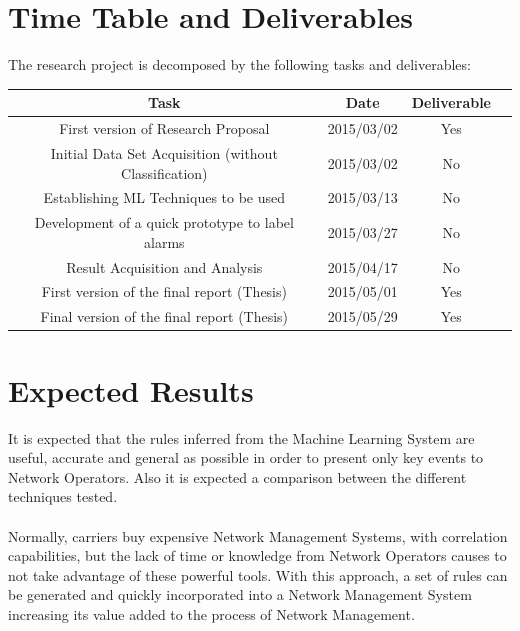 \documentclass[10pt,a4paper]{article}
\begin{document}
  \section{Time Table and Deliverables}
The research project is decomposed by the following tasks and deliverables:

\begin{center}
 \begin{tabular}{||c | c | c | c||} 
 \hline
 Task & Date & Deliverable \\ [0.7ex] 
 \hline\hline
 First version of Research Proposal  & 2015/03/02 & Yes \\ 
 \hline
 Initial Data Set Acquisition (without Classification) & 2015/03/02 & No \\ 
 \hline
 Establishing ML Techniques to be used & 2015/03/13 & No \\
 \hline
 Development of a quick prototype to label alarms & 2015/03/27 & No \\
 \hline
 Result Acquisition and Analysis  & 2015/04/17 & No \\
 \hline
 First version of the final report (Thesis) & 2015/05/01 & Yes \\
 \hline
 Final version of the final report (Thesis) & 2015/05/29 & Yes \\

 \hline
\end{tabular}
\end{center}

  \section{Expected Results}

It is expected that the rules inferred from the Machine Learning System are useful, accurate and general as possible in order to present only key events to Network Operators. Also it is expected a comparison between the different techniques tested.
\\\\
Normally, carriers buy expensive Network Management Systems, with correlation capabilities, but the lack of time or knowledge from Network Operators causes to not take advantage of these powerful tools. With this approach, a set of rules can be generated and quickly incorporated into a Network Management System increasing its value added to the process of Network Management.
\end{document}
